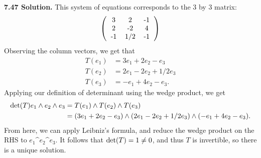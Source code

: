 \textbf{7.47 Solution.} This system of equations corresponds to the 3 by 3 matrix:
\[\left(\begin{tabular}{ccc}
    3 & 2 & -1 \\
    2 & -2 & 4 \\
    -1 & 1/2 & -1
\end{tabular}\right)\]
Observing the column vectors, we get that
\begin{align*}
    T(e_1) &= 3e_1 + 2e_2 - e_3 \\
    T(e_2) &= 2e_1 - 2e_2 + 1/2e_3 \\
    T(e_3) &= -e_1 + 4e_2 - e_3.
\end{align*}
Applying our definition of determinant using the wedge product, we get
\begin{align*}
    \text{det}(T)e_1 \wedge e_2 \wedge e_3 &= T(e_1) \wedge T(e_2) \wedge T(e_3) \\
    &= (3e_1 + 2e_2 - e_3) \wedge (2e_1 - 2e_2 + 1/2e_3) \wedge (-e_1 + 4e_2 - e_3).
\end{align*}
From here, we can apply Leibniz's formula, and reduce the wedge product on the RHS to $e_1 \^ e_2 \^ e_3$. It follows that $\text{det}(T) = 1 \neq 0$, and thus $T$ is invertible, so there is a unique solution.